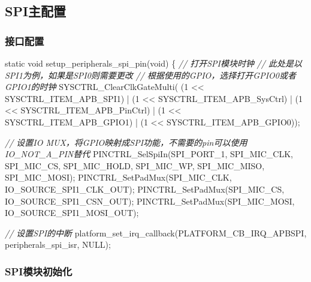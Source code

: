 \documentclass[
  12pt,
]{book}
\newenvironment{Shaded}{\begin{snugshade}}{\end{snugshade}}
\newcommand{\CommentTok}[1]{\textcolor[rgb]{0.56,0.35,0.01}{\textit{#1}}}
\newcommand{\DataTypeTok}[1]{\textcolor[rgb]{0.13,0.29,0.53}{#1}}
\newcommand{\DecValTok}[1]{\textcolor[rgb]{0.00,0.00,0.81}{#1}}
\newcommand{\NormalTok}[1]{#1}
\begin{document}
\hypertarget{spiux4e3bux914dux7f6e}{%
\subsection{SPI主配置}\label{spiux4e3bux914dux7f6e}}

\hypertarget{ux63a5ux53e3ux914dux7f6e}{%
\subsubsection{接口配置}\label{ux63a5ux53e3ux914dux7f6e}}

\begin{Shaded}
\begin{Highlighting}[]
\DataTypeTok{static} \DataTypeTok{void}\NormalTok{ setup_peripherals_spi_pin(}\DataTypeTok{void}\NormalTok{)}
\NormalTok{\{}
    \CommentTok{// 打开SPI模块时钟}
    \CommentTok{// 此处是以SPI1为例，如果是SPI0则需要更改}
    \CommentTok{// 根据使用的GPIO，选择打开GPIO0或者GPIO1的时钟}
\NormalTok{    SYSCTRL_ClearClkGateMulti(    (}\DecValTok{1}\NormalTok{ << SYSCTRL_ITEM_APB_SPI1)}
\NormalTok{                                | (}\DecValTok{1}\NormalTok{ << SYSCTRL_ITEM_APB_SysCtrl)}
\NormalTok{                                | (}\DecValTok{1}\NormalTok{ << SYSCTRL_ITEM_APB_PinCtrl)}
\NormalTok{                                | (}\DecValTok{1}\NormalTok{ << SYSCTRL_ITEM_APB_GPIO1)}
\NormalTok{                                | (}\DecValTok{1}\NormalTok{ << SYSCTRL_ITEM_APB_GPIO0));}

    \CommentTok{// 设置IO MUX，将GPIO映射成SPI功能，不需要的pin可以使用IO_NOT_A_PIN替代}
\NormalTok{    PINCTRL_SelSpiIn(SPI_PORT_1, SPI_MIC_CLK, SPI_MIC_CS, SPI_MIC_HOLD, SPI_MIC_WP, SPI_MIC_MISO, SPI_MIC_MOSI);}
\NormalTok{    PINCTRL_SetPadMux(SPI_MIC_CLK, IO_SOURCE_SPI1_CLK_OUT);}
\NormalTok{    PINCTRL_SetPadMux(SPI_MIC_CS, IO_SOURCE_SPI1_CSN_OUT);}
\NormalTok{    PINCTRL_SetPadMux(SPI_MIC_MOSI, IO_SOURCE_SPI1_MOSI_OUT);}
    
    \CommentTok{// 设置SPI的中断}
\NormalTok{    platform_set_irq_callback(PLATFORM_CB_IRQ_APBSPI, peripherals_spi_isr, NULL);}
\end{Highlighting}
\end{Shaded}

\hypertarget{spiux6a21ux5757ux521dux59cbux5316}{%
\subsubsection{SPI模块初始化}\label{spiux6a21ux5757ux521dux59cbux5316}}
\end{document}
